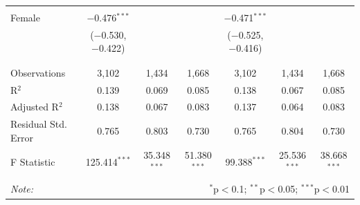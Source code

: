 \documentclass[12pt,a4paper]{article}
\numberwithin{equation}{section}
\begin{document}
\begin{landscape}
\begin{table}[!htbp]
\begin{tabular}{@{\extracolsep{5pt}}lcccccc}
			& & & & & & \\ 
			Female & $-$0.476$^{***}$ &  &  & $-$0.471$^{***}$ &  &  \\ 
			& ($-$0.530, $-$0.422) &  &  & ($-$0.525, $-$0.416) &  &  \\ 
			& & & & & & \\ 
			\hline \\[-1.8ex] 
			Observations & 3,102 & 1,434 & 1,668 & 3,102 & 1,434 & 1,668 \\ 
			R$^{2}$ & 0.139 & 0.069 & 0.085 & 0.138 & 0.067 & 0.085 \\ 
			Adjusted R$^{2}$ & 0.138 & 0.067 & 0.083 & 0.137 & 0.064 & 0.083 \\ 
			Residual Std. Error & 0.765 & 0.803 & 0.730 & 0.765 & 0.804 & 0.730 \\ 
			F Statistic & 125.414$^{***}$ & 35.348$^{***}$ & 51.380$^{***}$ & 99.388$^{***}$ & 25.536$^{***}$ & 38.668$^{***}$ \\ 
			\hline 
			\hline \\[-1.8ex] 
			\textit{Note:}  & \multicolumn{6}{r}{$^{*}$p$<$0.1; $^{**}$p$<$0.05; $^{***}$p$<$0.01} \\ 
		\end{tabular} 
	\end{table} 
	
\end{landscape}

\newpage
\end{document}
